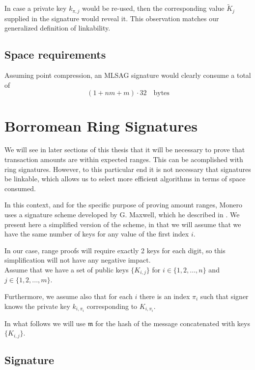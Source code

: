 In case a private key \(k_{\pi, j}\) would be re-used, then the corresponding value \(\tilde{K}_j\) supplied in the signature would reveal it.
This observation matches our generalized definition of linkability.


\subsection*{Space requirements}

Assuming point compression, an MLSAG signature would clearly consume a total of 
    \[(1 + n m + m) \cdot 32 \quad \textrm{bytes}\]


\section{Borromean Ring Signatures}
\label{sec:borromean}

We will see in later sections of this thesis that it will be necessary to prove that transaction amounts are within
expected ranges.
This can be acomplished with ring signatures. 
However, to this particular end it is not necessary that signatures be linkable, which allows us to select more efficient algorithms in terms of space consumed.

In this context, and for the specific purpose of proving amount ranges, Monero uses a signature scheme developed by G. Maxwell, which he described  in \cite{Signatures2015BorromeanRS}.
We present here a simplified version of the scheme, in that we will assume that
we have the same number of keys for any value of the first index \(i\).

In our case, range proofs will require exactly 2 keys for each digit, so this simplification
will not have any negative impact. 
\\


Assume that we have a set of public keys \(\{ K_{i,j} \} \) for \(i \in \{1, 2, ..., n\}\) and \(j \in \{1, 2, ..., m\}\).

Furthermore, we assume also that for each \(i\) there is an index \(\pi_i\) such that signer knows the private key \(k_{i,\pi_i}\) corresponding to \(K_{i,\pi_i}\).

In what follows we will use \(\mathfrak{m}\) for the hash of the message concatenated with keys
\(\{ K_{i,j} \} \).

\subsection*{Signature}


